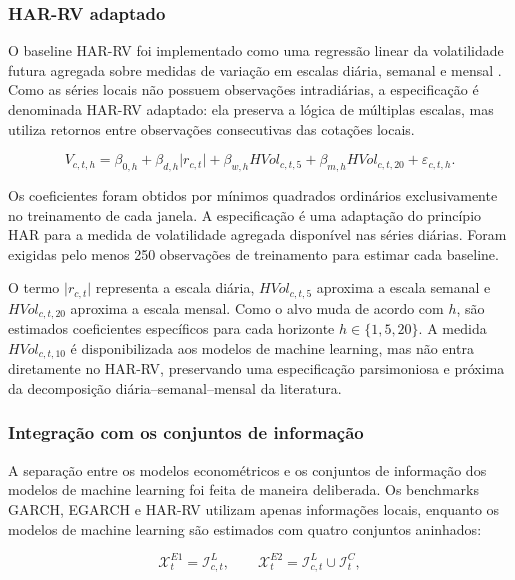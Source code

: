 \documentclass[a4paper,fleqn]{cas-sc}
\begin{document}
\subsubsection{HAR-RV adaptado}

O baseline HAR-RV foi implementado como uma regressão linear da volatilidade futura agregada sobre medidas de variação em escalas diária, semanal e mensal \citep{Corsi2009HAR,Bonato2024AgriculturalHAR}. Como as séries locais não possuem observações intradiárias, a especificação é denominada HAR-RV adaptado: ela preserva a lógica de múltiplas escalas, mas utiliza retornos entre observações consecutivas das cotações locais.

\begin{equation}
V_{c,t,h}
=
\beta_{0,h}
+\beta_{d,h}\lvert r_{c,t}\rvert
+\beta_{w,h}HVol_{c,t,5}
+\beta_{m,h}HVol_{c,t,20}
+\varepsilon_{c,t,h}.
\label{eq:har}
\end{equation}

Os coeficientes foram obtidos por mínimos quadrados ordinários exclusivamente no treinamento de cada janela. A especificação é uma adaptação do princípio HAR para a medida de volatilidade agregada disponível nas séries diárias. Foram exigidas pelo menos 250 observações de treinamento para estimar cada baseline.

O termo \(\lvert r_{c,t}\rvert\) representa a escala diária, \(HVol_{c,t,5}\) aproxima a escala semanal e \(HVol_{c,t,20}\) aproxima a escala mensal. Como o alvo muda de acordo com \(h\), são estimados coeficientes específicos para cada horizonte \(h\in\{1,5,20\}\). A medida \(HVol_{c,t,10}\) é disponibilizada aos modelos de machine learning, mas não entra diretamente no HAR-RV, preservando uma especificação parsimoniosa e próxima da decomposição diária--semanal--mensal da literatura.

\subsubsection{Integração com os conjuntos de informação}

A separação entre os modelos econométricos e os conjuntos de informação dos modelos de machine learning foi feita de maneira deliberada. Os benchmarks GARCH, EGARCH e HAR-RV utilizam apenas informações locais, enquanto os modelos de machine learning são estimados com quatro conjuntos aninhados:

\begin{equation}
\mathcal{X}^{E1}_{t}=\mathcal{I}^{L}_{c,t},
\qquad
\mathcal{X}^{E2}_{t}=\mathcal{I}^{L}_{c,t}\cup\mathcal{I}^{C}_{t},
\end{equation}
\end{document}
